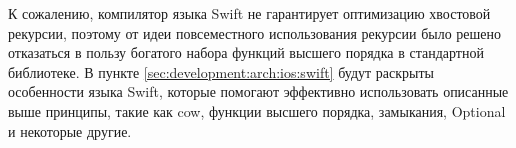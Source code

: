 К сожалению, компилятор языка Swift не гарантирует оптимизацию хвостовой рекурсии, поэтому от идеи повсеместного использования рекурсии было решено отказаться в пользу богатого набора функций высшего порядка в стандартной библиотеке. В пункте \ref{sec:development:arch:ios:swift} будут раскрыты особенности языка Swift, которые помогают эффективно использовать описанные выше принципы, такие как \gls{cow}, функции высшего порядка, замыкания, Optional и некоторые другие.